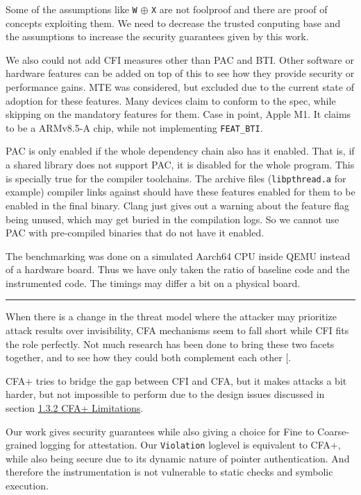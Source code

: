 \documentclass[a4paper, nobind]{templates/ociamthesis}
\begin{document}
Some of the assumptions like \texttt{W} \(\oplus\) \texttt{X} are not foolproof and there are
proof of concepts exploiting them. We need to decrease the trusted conputing base and the
assumptions to increase the security guarantees given by this work.

We also could not add CFI measures other than PAC and BTI. Other software or
hardware features can be added on top of this to see how they provide security or performance gains.
MTE was considered, but excluded due to the current state of adoption for these
features. Many devices claim to conform to the spec, while skipping on the mandatory features for them.
Case in point, Apple M1. It claims to be a ARMv8.5-A chip, while not implementing \texttt{FEAT\_BTI}.

PAC is only enabled if the whole dependency chain also has it enabled. That is, if
a shared library does not support PAC, it is disabled for the whole program.
This is specially true for the compiler toolchains. The archive
files (\texttt{libpthread.a} for example) compiler links against should have these
features enabled for them to be enabled in the final binary. Clang just gives out a
warning about the feature flag being unused, which may get buried in the compilation logs.
So we cannot use PAC with pre-compiled binaries that do not have it enabled.

The benchmarking was done on a simulated Aarch64 CPU inside QEMU instead of a
hardware board. Thus we have only taken the ratio of baseline code and the
instrumented code. The timings may differ a bit on a physical board.

\begin{center}\rule{0.5\linewidth}{0.5pt}\end{center}

When there is a change in the threat model where the attacker may prioritize
attack results over invisibility, CFA mechanisms seem to fall short while CFI fits the
role perfectly. Not much research has been done to bring these two facets together,
and to see how they could both complement each other {[}\citeproc{ref-sok}{5}{]}.

CFA+ tries to bridge the gap between CFI and CFA, but it makes attacks a bit harder,
but not impossible to perform due to the design issues discussed in section
\hyperref[cfaplus-limitations]{1.3.2 CFA+ Limitations}.

Our work gives security guarantees while also giving a choice for Fine to Coarse-grained
logging for attestation. Our \texttt{Violation} loglevel is equivalent to CFA+,
while also being secure due to its dynamic nature of pointer authentication.
And therefore the instrumentation is not vulnerable to static checks and symbolic execution.
\end{document}
